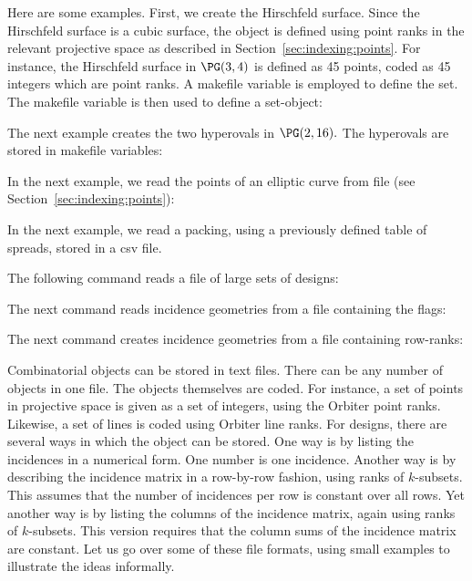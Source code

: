 Here are some examples. First, we create the Hirschfeld surface.
Since the Hirschfeld surface is a cubic surface, 
the object is defined using point ranks in the relevant projective space 
as described in Section~\ref{sec:indexing:points}. 
For instance, the Hirschfeld surface in $\PG(3,4)$ is defined as 45 points, 
coded as 45 integers which are point ranks.
A makefile variable is employed to define the set.
The makefile variable is then used to define a set-object:
{\tt

}
{\tt

}
The next example creates the two hyperovals in $\PG(2,16).$ 
The hyperovals are stored in makefile variables:
{\tt

}
{\tt

}
{\tt

}
In the next example, we read the points 
of an elliptic curve from file (see Section~\ref{sec:indexing:points}):
{\tt

}
In the next example, we read a packing, 
using a previously defined table of spreads, stored in a csv file.
{\tt

}
The following command reads a file of large sets of designs:
{\tt

}
The next command reads incidence geometries from a file containing the flags:
{\tt

}
The next command creates incidence geometries from a file containing row-ranks:
{\tt

}

Combinatorial objects can be stored in text files. 
There can be any number of objects in one file.
The objects themselves are coded. 
For instance, a set of points in projective space 
is given as a set of integers, using the Orbiter point ranks. 
Likewise, a set of lines is coded using Orbiter line ranks. 
For designs, there are several ways in which the object can be stored. 
One way is by listing the incidences in a numerical form. 
One number is one incidence. 
Another way is by describing the incidence matrix in a row-by-row fashion, using ranks of $k$-subsets.
This assumes that the number of incidences per row is constant over all rows.  
Yet another way is by listing the columns of the incidence matrix, again using ranks of $k$-subsets. 
This version requires that the column sums of the incidence matrix are constant.
Let us go over some of these file formats, using small examples to illustrate the ideas informally.


